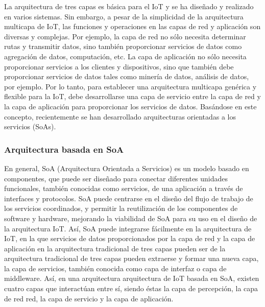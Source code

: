 {La arquitectura de tres capas es básica para el IoT y se ha diseñado y realizado en varios sistemas. Sin embargo, a pesar de la simplicidad de la arquitectura multicapa de IoT, las funciones y operaciones en las capas de red y aplicación son diversas y complejas. Por ejemplo, la capa de red no sólo necesita determinar rutas y transmitir datos, sino también proporcionar servicios de datos como agregación de datos, computación, etc. La capa de aplicación no sólo necesita proporcionar servicios a los clientes y dispositivos, sino que también debe proporcionar servicios de datos tales como minería de datos, análisis de datos, por ejemplo. Por lo tanto, para establecer una arquitectura multicapa genérica y flexible para la IoT, debe desarrollarse una capa de servicio entre la capa de red y la capa de aplicación para proporcionar los servicios de datos. Basándose en este concepto, recientemente se han desarrollado arquitecturas orientadas a los servicios (SoAs).

\subsubsection{Arquitectura basada en SoA}

En general, SoA (Arquitectura Orientada a Servicios) es un modelo basado en componentes, que puede ser diseñado para conectar diferentes unidades funcionales, también conocidas como servicios, de una aplicación a través de interfaces y protocolos. SoA puede centrarse en el diseño del flujo de trabajo de los servicios coordinados, y permitir la reutilización de los componentes de software y hardware, mejorando la viabilidad de SoA para su uso en el diseño de la arquitectura IoT. Así, SoA puede integrarse fácilmente en la arquitectura de IoT, en la que servicios de datos proporcionados por la capa de red y la capa de aplicación en la arquitectura tradicional de tres capas pueden ser de la arquitectura tradicional de tres capas pueden extraerse y formar una nueva capa, la capa de servicios, también conocida como capa de interfaz o capa de middleware. Así, en una arquitectura arquitectura de IoT basada en SoA, existen cuatro capas que interactúan entre sí, siendo éstas la capa de percepción, la capa de red red, la capa de servicio y la capa de aplicación. \\

}
